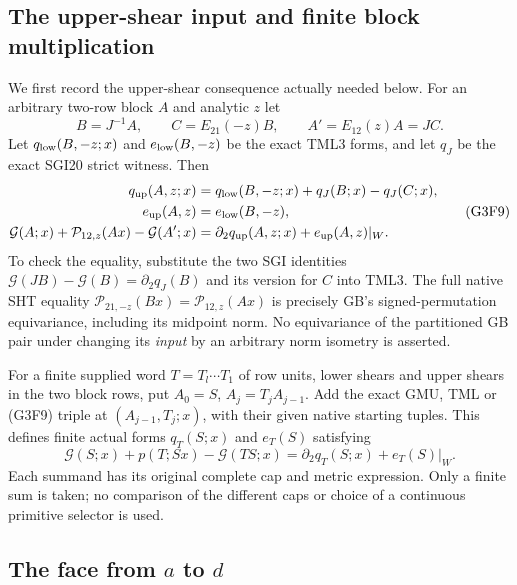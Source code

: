 \subsection{The upper-shear input and finite block multiplication}

We first record the upper-shear consequence actually needed below.
For an arbitrary two-row block $A$ and analytic $z$ let
\[
 B=J^{-1}A,\qquad C=E_{21}(-z)B,
 \qquad A'=E_{12}(z)A=JC.
 \tag{G3F8}
\]
Let $q_{\rm low}(B,-z;x)$ and $e_{\rm low}(B,-z)$ be the exact
TML3 forms, and let $q_J$ be the exact SGI20 strict witness.  Then
\[
 \begin{split}
 q_{\rm up}(A,z;x)
   &=q_{\rm low}(B,-z;x)+q_J(B;x)-q_J(C;x),\\
 e_{\rm up}(A,z)&=e_{\rm low}(B,-z),\\
 \mathcal G(A;x)+\mathcal P_{12,z}(Ax)-\mathcal G(A';x)
   &=\partial_2q_{\rm up}(A,z;x)+e_{\rm up}(A,z)|_W.
 \end{split}
 \tag{G3F9}
\]
To check the equality, substitute the two SGI identities
$\mathcal G(JB)-\mathcal G(B)=\partial_2q_J(B)$ and its version
for $C$ into TML3.  The full native SHT equality
$\mathcal P_{21,-z}(Bx)=\mathcal P_{12,z}(Ax)$ is precisely
GB's signed-permutation equivariance, including its midpoint norm.
No equivariance of the partitioned GB pair under changing its
\emph{input} by an arbitrary norm isometry is asserted.

For a finite supplied word $T=T_l\cdots T_1$ of row units,
lower shears and upper shears in the two block rows, put
$A_0=S$, $A_j=T_jA_{j-1}$.  Add the exact GMU, TML or (G3F9)
triple at $(A_{j-1},T_j;x)$, with their given native starting
tuples.  This defines finite actual forms $q_T(S;x)$ and $e_T(S)$
satisfying
\[
 \mathcal G(S;x)+p(T;Sx)-\mathcal G(TS;x)
                        =\partial_2q_T(S;x)+e_T(S)|_W.
 \tag{G3F10}
\]
Each summand has its original complete cap and metric expression.
Only a finite sum is taken; no comparison of the different caps
or choice of a continuous primitive selector is used.

\subsection{The face from $a$ to $d$}

